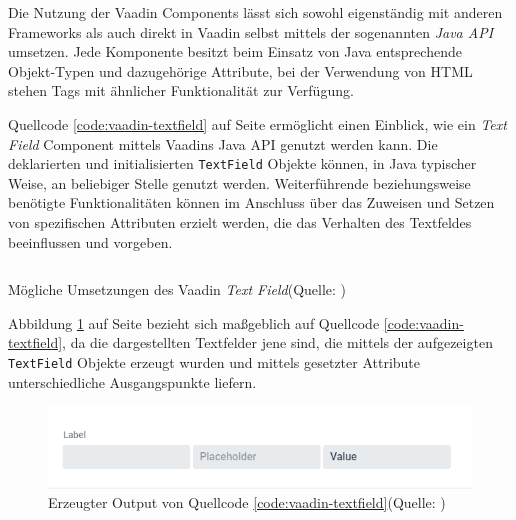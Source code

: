 \documentclass[a4paper,12pt,twoside]{scrreprt}
\begin{document}
Die Nutzung der Vaadin Components lässt sich sowohl eigenständig mit anderen Frameworks als auch direkt in Vaadin selbst mittels der sogenannten \textit{Java API} umsetzen. Jede Komponente besitzt beim Einsatz von Java entsprechende Objekt-Typen und dazugehörige Attribute, bei der Verwendung von HTML stehen Tags mit ähnlicher Funktionalität zur Verfügung. \parencite[][]{vaadin_ltd_mobile_nodate}

\medskip

Quellcode \ref{code:vaadin-textfield} auf Seite \pageref{code:vaadin-textfield} ermöglicht einen Einblick, wie ein \textit{Text Field} Component mittels Vaadins Java API genutzt werden kann. Die deklarierten und initialisierten \texttt{TextField} Objekte können, in Java typischer Weise, an beliebiger Stelle genutzt werden. Weiterführende beziehungsweise benötigte Funktionalitäten können im Anschluss über das Zuweisen und Setzen von spezifischen Attributen erzielt werden, die das Verhalten des Textfeldes beeinflussen und vorgeben.

\begin{listing}[ht]
    \inputminted[fontsize=\footnotesize,linenos]{java}{code/Vaadin_Text-Field_sample.java}
    \caption[Mögliche Umsetzungen des Vaadin \textit{Text Field}]{Mögliche Umsetzungen des Vaadin \textit{Text Field}\newline(Quelle: \cite[][Basic text field]{vaadin_ltd_java_nodate})}
    \label{code:vaadin-textfield}
\end{listing}

Abbildung \ref{fig:vaadin-textfield-output} auf Seite \pageref{fig:vaadin-textfield-output} bezieht sich maßgeblich auf Quellcode \ref{code:vaadin-textfield}, da die dargestellten Textfelder jene sind, die mittels der aufgezeigten \texttt{TextField} Objekte erzeugt wurden und mittels gesetzter Attribute unterschiedliche Ausgangspunkte liefern.

\begin{figure}[ht]
    \centering
    \includegraphics[scale=0.7]{images/Vaadin_Text-Field-output.png}
    \caption[Erzeugter Output von Quellcode \ref{code:vaadin-textfield}]{Erzeugter Output von Quellcode \ref{code:vaadin-textfield}\newline(Quelle: \cite[][Basic text field]{vaadin_ltd_java_nodate})}
    \label{fig:vaadin-textfield-output}
\end{figure}
\end{document}
